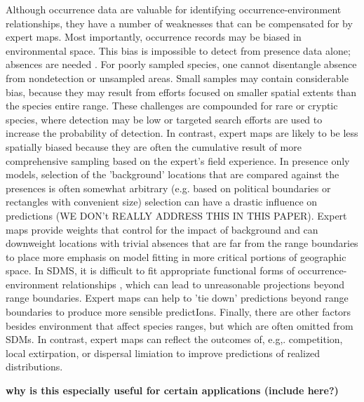 Although occurrence data are valuable for identifying occurrence-environment relationships, they have a number of weaknesses that can be compensated for by expert maps. Most importantly, occurrence records may be biased in environmental space. This bias is impossible to detect from presence data alone; absences are needed \citep{Merow:2013tg,Merow:2014hw}. For poorly sampled species, one cannot disentangle absence from nondetection or unsampled areas. Small samples may contain considerable bias, because they may result from efforts focused on smaller spatial extents than the species entire range. These challenges are compounded for rare or cryptic species, where detection may be low or targeted search efforts are used to increase the probability of detection. In contrast, expert maps are likely to be less spatially biased because they are often the cumulative result of more comprehensive sampling based on the expert's field experience. In presence only models, selection of the 'background' locations that are compared against the presences is often somewhat arbitrary (e.g. based on political boundaries or rectangles with convenient size) selection can have a drastic influence on predictions \citep{Merow:2013tg} (WE DON't REALLY ADDRESS THIS IN THIS PAPER). Expert maps provide weights that control for the impact of background and can downweight locations with trivial absences that are far from the range boundaries to place more emphasis on model fitting in more critical portions of geographic space. In SDMS, it is difficult to fit appropriate functional forms of occurrence-environment relationships \citep{Merow:2014hw}, which can lead to unreasonable projections beyond range boundaries. Expert maps can help to 'tie down' predictions beyond range boundaries to produce more sensible predictIons. Finally, there are other factors besides environment that affect species ranges, but which are often omitted from SDMs. In contrast, expert maps can reflect the outcomes of, e.g,. competition, local extirpation, or dispersal limiation to improve predictions of realized distributions. 


\textbf{why is this especially useful for certain applications (include here?)} 

